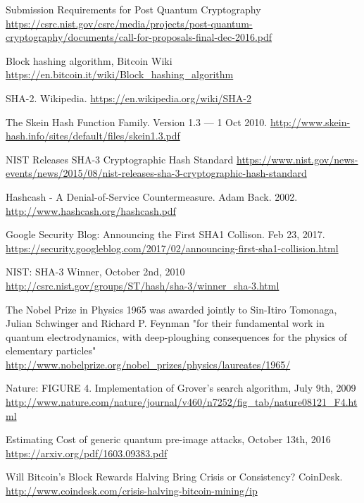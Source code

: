 \documentclass[11pt]{article}
\begin{document}
\begin{thebibliography}{7}
Submission Requirements for Post Quantum Cryptography
\url{https://csrc.nist.gov/csrc/media/projects/post-quantum-cryptography/documents/call-for-proposals-final-dec-2016.pdf}
 
Block hashing algorithm, Bitcoin Wiki \url{https://en.bitcoin.it/wiki/Block_hashing_algorithm}

SHA-2. Wikipedia.
\url{https://en.wikipedia.org/wiki/SHA-2}

The Skein Hash Function Family. Version 1.3 — 1 Oct 2010.
\url{http://www.skein-hash.info/sites/default/files/skein1.3.pdf}

NIST Releases SHA-3 Cryptographic Hash Standard \url{https://www.nist.gov/news-events/news/2015/08/nist-releases-sha-3-cryptographic-hash-standard}

Hashcash - A Denial-of-Service Countermeasure. Adam Back. 2002. \url{http://www.hashcash.org/hashcash.pdf}

Google Security Blog: Announcing the First SHA1 Collison. Feb 23, 2017.
\url{https://security.googleblog.com/2017/02/announcing-first-sha1-collision.html}

NIST: SHA-3 Winner, October 2nd, 2010
\url{http://csrc.nist.gov/groups/ST/hash/sha-3/winner_sha-3.html}

The Nobel Prize in Physics 1965 was awarded jointly to Sin-Itiro Tomonaga, Julian Schwinger and Richard P. Feynman "for their fundamental work in quantum electrodynamics, with deep-ploughing consequences for the physics of elementary particles"
\url{http://www.nobelprize.org/nobel_prizes/physics/laureates/1965/}


Nature: FIGURE 4. Implementation of Grover's search algorithm, July 9th, 2009
\url{http://www.nature.com/nature/journal/v460/n7252/fig_tab/nature08121_F4.html}


Estimating Cost of generic quantum pre-image attacks, October 13th, 2016
\url{https://arxiv.org/pdf/1603.09383.pdf}

Will Bitcoin's Block Rewards Halving Bring Crisis or Consistency? CoinDesk.
\url{http://www.coindesk.com/crisis-halving-bitcoin-mining/ip}



\end{thebibliography}
\end{document}

